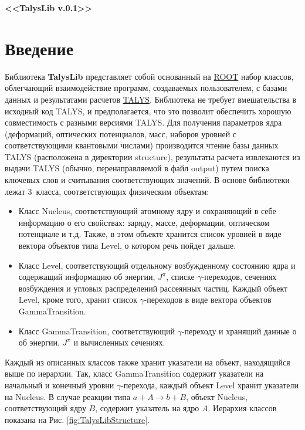 \documentclass[a4paper,12pt]{extarticle}
\begin{document}
\begin{titlepage}
\pagestyle{empty} %
\begin{center}
\vspace{4cm}
\Large{\textbf{<<TalysLib v.0.1>>}}\\
\vspace{1.6cm}
\newpage
\end{center}
\tableofcontents%
\end{titlepage}
\section{Введение}
Библиотека \textbf{TalysLib} представляет собой основанный на \href{https://root.cern/}{ROOT} набор классов, облегчающий взаимодействие программ, создаваемых пользователем, с базами данных и результатами расчетов \href{https://tendl.web.psi.ch/tendl_2019/talys.html}{TALYS}. Библиотека не требует вмешательства в исходный код TALYS, и предполагается, что это позволит обеспечить хорошую совместимость с разными версиями TALYS. Для получения параметров ядра (деформаций, оптических потенциалов, масс, наборов уровней с соответствующими квантовыми числами) производится чтение базы данных TALYS (расположена в директории structure), результаты расчета извлекаются из выдачи TALYS (обычно, перенаправляемой в файл output) путем поиска ключевых слов и считывания соответствующих значений.
В основе библиотеки лежат 3~класса, соответствующих физическим объектам:
\begin{itemize}
\item Класс Nucleus, соответствующий атомному ядру и сохраняющий в себе информацию о его свойствах: заряду, массе, деформации, оптическом потенциале и т.д. Также, в этом объекте хранится список уровней в виде вектора объектов типа Level, о котором речь пойдет дальше.
\item Класс Level, соответствующий отдельному возбужденному состоянию ядра и содержащий информацию об энергии, $J^\pi$, списке $\gamma$-переходов, сечениях возбуждения и угловых распределений рассеянных частиц. Каждый объект Level, кроме того, хранит список $\gamma$-переходов в виде вектора объектов GammaTransition.
\item Класс GammaTransition, соответствующий $\gamma$-переходу и хранящий данные о об энергии, $J^\pi$ и вычисленных сечениях.
\end{itemize}
Каждый из описанных классов также хранит указатели на объект, находящийся выше по иерархии. Так, класс GammaTransition содержит указатели на начальный и конечный уровни $\gamma$-перехода, каждый объект Level хранит указатели на Nucleus. В случае реакции типа $a+A\to b+B$, объект Nucleus, соответствующий ядру $B$, содержит указатель на ядро $A$. Иерархия классов показана на Рис. \ref{fig:TalysLibStructure}.
\end{document}
